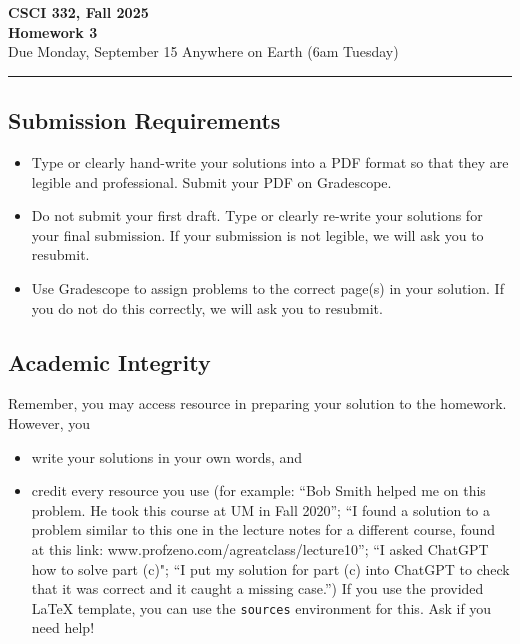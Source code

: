 \documentclass[11pt]{article}
\begin{document}
\begin{center}
\Large\textbf{CSCI 332, Fall 2025}%
\\
\LARGE\textbf{Homework 3}%
\\[0.5ex]
\large Due Monday, September 15 Anywhere on Earth (6am Tuesday)
\end{center}

\bigskip
\hrule
\bigskip

\subsection*{Submission Requirements}
\begin{itemize}
    \item Type or clearly hand-write your solutions into a PDF format so that they are legible and professional. Submit your PDF on Gradescope. 
    \item Do not submit your first draft. Type or clearly re-write your solutions for your final submission. If your submission is not legible, we will ask you to resubmit.
    \item Use Gradescope to assign problems to the correct page(s) in your solution. If you do not do this correctly, we will ask you to resubmit.
\end{itemize}

\subsection*{Academic Integrity}

Remember, you may access  resource in preparing your solution to the homework. However, you 
\begin{itemize}
    \item write your solutions in your own words, and
    \item credit every resource you use (for example: ``Bob Smith helped me on
    this problem. He took this course at UM in Fall 2020''; ``I found a solution
    to a problem similar to this one in the lecture notes for a different
    course, found at this link: www.profzeno.com/agreatclass/lecture10''; ``I
    asked ChatGPT how to solve  part (c)"; ``I put my solution for part (c) into
    ChatGPT to check that it was correct and it caught a missing case.'') If you
    use the provided LaTeX template, you can use the \texttt{sources}
    environment for this. Ask if you need help!
\end{itemize}
\end{document}
